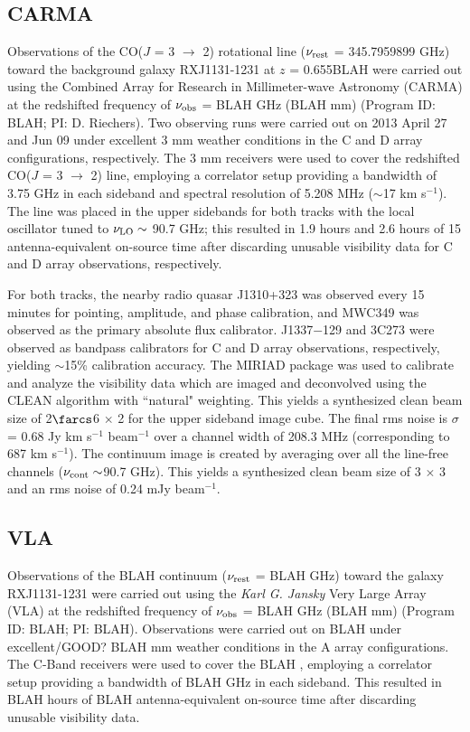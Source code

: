 \documentclass[]{emulateapj}
\begin{document}
\subsection{CARMA} \label{sec:carmadata}
Observations of the CO($J$ = 3 $\rightarrow$ 2) rotational line ($\nu_{\rm rest}$ = 345.7959899 GHz) toward the background galaxy RXJ1131-1231 at $z$ = 
0.655BLAH 
 were carried out using the Combined Array for Research in Millimeter-wave Astronomy (CARMA) at the redshifted frequency of $\nu_{\rm obs}$ = BLAH GHz (BLAH mm) (Program ID: BLAH; PI: D. Riechers).
Two observing runs were carried out on 2013 April 27 and Jun 09 under excellent 3 mm weather conditions in the C and D array configurations, respectively. The 3 mm receivers were used to cover the redshifted CO($J$ = 3 $\rightarrow$ 2) line, employing a correlator setup providing a bandwidth of 3.75 GHz in each sideband and spectral resolution of 5.208 MHz ($\sim$17 km s$^{-1}$). The line was placed in the
upper sidebands for both tracks with the local oscillator tuned to $\nu_{\rm LO}\sim$ 90.7 GHz; this resulted in 1.9 hours and 2.6 hours of 15 antenna-equivalent on-source time after discarding unusable visibility data for C and D array observations, respectively.

For both tracks, the nearby radio quasar J1310+323 was observed every 15 minutes for
pointing, amplitude, and phase calibration, and MWC349 was observed as the primary
absolute flux calibrator. J1337$-$129 and 3C273 were observed as bandpass calibrators for C and D array observations, respectively, yielding $\sim
$15\% calibration accuracy.
The MIRIAD package was used to calibrate and analyze the visibility data which are imaged and deconvolved using
the CLEAN algorithm with ``natural" weighting. This yields a synthesized clean beam size of 2$\farcs$6 $\times$ 2 for the upper sideband image cube. The final rms noise is $\sigma$ = 0.68 Jy km s$^{-1}$ beam$^{-1}$ over a channel width of 208.3 MHz (corresponding to 687 km s$^{-1}$). %
The continuum image is created by
averaging over all the line-free channels ($\nu_{\rm cont}\sim$90.7 GHz). This yields a synthesized clean beam size of 3 $\times$ 3 and an rms noise of 0.24 mJy beam$^{-1}$.

\subsection{VLA} 
Observations of the BLAH continuum ($\nu_{\rm rest}$ = BLAH GHz) toward the galaxy RXJ1131-1231 were carried out using the {\it Karl G. Jansky} Very Large Array (VLA) at the redshifted frequency of $\nu_{\rm obs}$ = BLAH GHz (BLAH mm) (Program ID: BLAH; PI: BLAH).
Observations were carried out on BLAH under excellent/GOOD? BLAH mm weather conditions in the A array configurations. The C-Band receivers were used to cover the BLAH
, employing a correlator setup providing a bandwidth of BLAH GHz in each sideband. This resulted in BLAH hours of BLAH antenna-equivalent on-source time after discarding unusable visibility data.
\end{document}
